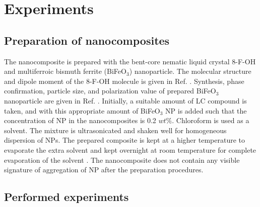 \documentclass[reprint,amsfonts,amsmath,amssymb,aps,pre,floatfix,10pt]{revtex4-1}
\begin{document}
\section{Experiments}
\subsection{Preparation of nanocomposites}
The nanocomposite is prepared with the bent-core nematic liquid crystal 8-F-OH and multiferroic bismuth ferrite (BiFeO$_3$) nanoparticle. The molecular structure and dipole moment of the 8-F-OH molecule is given in Ref. \cite{zhang2022electric_27}. Synthesis, phase confirmation, particle size, and polarization value of prepared BiFeO$_3$ nanoparticle are given in Ref. \cite{Dhananjoy2023dielectric_21}.  Initially, a suitable amount of LC compound is taken, and with this appropriate amount of BiFeO$_3$ NP is added such that the concentration of NP in the nanocomposites is 0.2 $wt\%$. Chloroform is used as a solvent. The mixture is ultrasonicated and shaken well for homogeneous dispersion of NPs. The prepared composite is kept at a higher temperature to evaporate the extra solvent and kept overnight at room temperature for complete evaporation of the solvent \cite{kumar2018nanodoping_12}. The nanocomposite does not contain any visible signature of aggregation of NP after the preparation procedures.

\subsection{Performed experiments}
\end{document}
